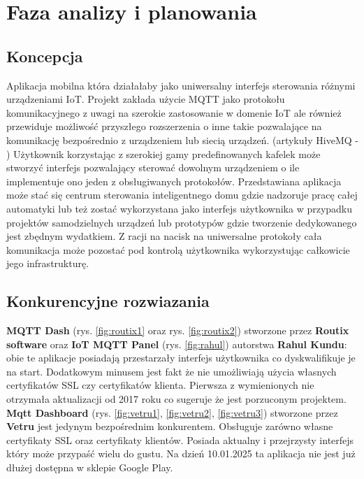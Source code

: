 \section{Faza analizy i planowania}

\subsection{Koncepcja}
Aplikacja mobilna która działałaby jako uniwersalny interfejs sterowania różnymi urządzeniami IoT. Projekt zakłada użycie MQTT jako protokołu komunikacyjnego z uwagi na szerokie zastosowanie w domenie IoT ale również przewiduje możliwość przyszłego rozszerzenia o inne takie pozwalające na komunikację bezpośrednio z urządzeniem lub siecią urządzeń. (artykuły HiveMQ - \cite{mqttincreasedadoption}\cite{mqttadoptionishigh}) Użytkownik korzystając z szerokiej gamy predefinowanych kafelek może stworzyć interfejs pozwalający sterować dowolnym urządzeniem o ile implementuje ono jeden z obsługiwanych protokołów. Przedstawiana aplikacja może stać się centrum sterowania inteligentnego domu gdzie nadzoruje pracę całej automatyki lub też zostać wykorzystana jako interfejs użytkownika w przypadku projektów samodzielnych urządzeń lub prototypów gdzie tworzenie dedykowanego jest zbędnym wydatkiem. Z racji na nacisk na uniwersalne protokoły cała komunikacja może pozostać pod kontrolą użytkownika wykorzystując całkowicie jego infrastrukturę.

\subsection{Konkurencyjne rozwiazania}

\textbf{MQTT Dash} (rys. \ref{fig:routix1} oraz rys. \ref{fig:routix2}) stworzone przez \textbf{Routix software} oraz \textbf{IoT MQTT Panel} (rys. \ref{fig:rahul}) autorstwa \textbf{Rahul Kundu}: obie te aplikacje posiadają przestarzały interfejs użytkownika co dyskwalifikuje je na start. Dodatkowym minusem jest fakt że nie umożliwiają użycia własnych certyfikatów SSL czy certyfikatów klienta. Pierwsza z wymienionych nie otrzymała aktualizacji od 2017 roku co sugeruje że jest porzuconym projektem.\\

\textbf{Mqtt Dashboard} (rys. \ref{fig:vetru1}, \ref{fig:vetru2}, \ref{fig:vetru3}) stworzone przez \textbf{Vetru} jest jedynym bezpośrednim konkurentem. Obsługuje zarówno własne certyfikaty SSL oraz certyfikaty klientów. Posiada aktualny i przejrzysty interfejs który może przypaść wielu do gustu. Na dzień 10.01.2025 ta aplikacja nie jest już dłużej dostępna w sklepie Google Play.


